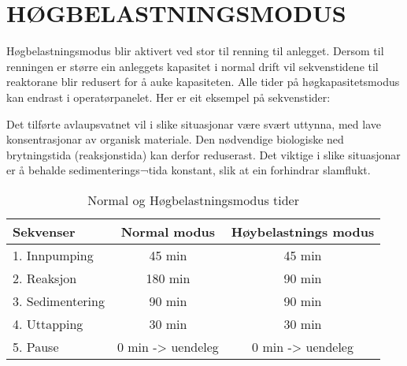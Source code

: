 \newpage
\section{HØGBELASTNINGSMODUS}

Høgbelastningsmodus blir aktivert ved stor til renning til anlegget. 
Dersom til renningen er større ein anleggets kapasitet i normal drift vil sekvenstidene til reaktorane blir redusert for å auke kapasiteten. 
Alle tider på høgkapasitetsmodus kan endrast i operatørpanelet.
Her er eit eksempel på sekvenstider:

Det tilførte avlaupsvatnet vil i slike situasjonar være svært uttynna, med lave konsentrasjonar av organisk materiale.
Den nødvendige biologiske ned brytningstida (reaksjonstida) kan derfor reduserast. 
Det viktige i slike situasjonar er å behalde sedimenterings¬tida konstant, slik at ein forhindrar slamflukt.

\begin{table}[h]
    \centering
    \begin{tabular}{|l|c|c|}
    \hline
        \rowcolor{myblack} %
        \textcolor{purewhite}{Sekvenser} & \textcolor{purewhite}{Normal modus} & \textcolor{purewhite}{Høybelastnings modus} \\ \hline
        \rowcolor{lightgray} 1. Innpumping & 45 min & 45 min \\ \hline
        \rowcolor{purewhite} 2. Reaksjon & 180 min & 90 min \\ \hline 
        \rowcolor{lightgray} 3. Sedimentering & 90 min & 90 min \\ \hline
        \rowcolor{purewhite} 4. Uttapping & 30 min & 30 min \\ \hline
        \rowcolor{lightgray} 5. Pause & 0 min -> uendeleg & 0 min -> uendeleg  \\ \hline
    \end{tabular}
    \caption{Normal og Høgbelastningsmodus tider}\label{table:Normal Og Høgbelastningsmodus}
\end{table}




